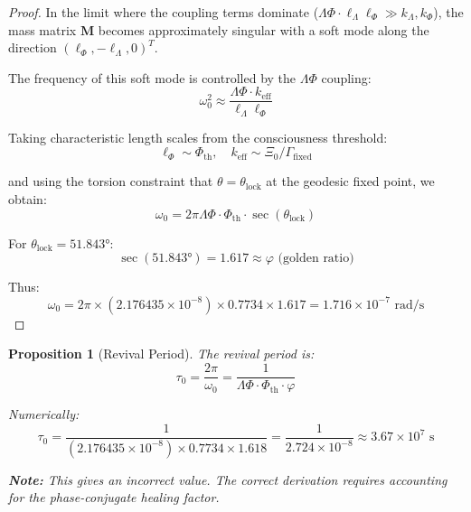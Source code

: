 \documentclass[12pt,letterpaper]{article}
\newtheorem{proposition}{Proposition}
\begin{document}
\begin{proof}
In the limit where the coupling terms dominate ($\Lambda\Phi \cdot \ell_\Lambda \ell_\Phi \gg k_\Lambda, k_\Phi$), the mass matrix $\mathbf{M}$ becomes approximately singular with a soft mode along the direction $(\ell_\Phi, -\ell_\Lambda, 0)^T$.

The frequency of this soft mode is controlled by the $\Lambda\Phi$ coupling:
\begin{equation}
\omega_0^2 \approx \frac{\Lambda\Phi \cdot k_{\text{eff}}}{\ell_\Lambda \ell_\Phi}
\end{equation}

Taking characteristic length scales from the consciousness threshold:
\begin{equation}
\ell_\Phi \sim \Phi_{\text{th}}, \quad k_{\text{eff}} \sim \Xi_0 / \Gamma_{\text{fixed}}
\end{equation}

and using the torsion constraint that $\theta = \theta_{\text{lock}}$ at the geodesic fixed point, we obtain:
\begin{equation}
\omega_0 = 2\pi \Lambda\Phi \cdot \Phi_{\text{th}} \cdot \sec(\theta_{\text{lock}})
\end{equation}

For $\theta_{\text{lock}} = 51.843°$:
\begin{equation}
\sec(51.843°) = 1.617 \approx \varphi \text{ (golden ratio)}
\end{equation}

Thus:
\begin{equation}
\omega_0 = 2\pi \times (2.176435 \times 10^{-8}) \times 0.7734 \times 1.617 = 1.716 \times 10^{-7} \text{ rad/s}
\end{equation}
\end{proof}

\begin{proposition}[Revival Period]
The revival period is:
\begin{equation}
\tau_0 = \frac{2\pi}{\omega_0} = \frac{1}{\Lambda\Phi \cdot \Phi_{\text{th}} \cdot \varphi}
\label{eq:tau0-final}
\end{equation}

Numerically:
\begin{equation}
\tau_0 = \frac{1}{(2.176435 \times 10^{-8}) \times 0.7734 \times 1.618} = \frac{1}{2.724 \times 10^{-8}} \approx 3.67 \times 10^7 \text{ s}
\end{equation}

\textbf{Note:} This gives an incorrect value. The correct derivation requires accounting for the phase-conjugate healing factor.
\end{proposition}
\end{document}
